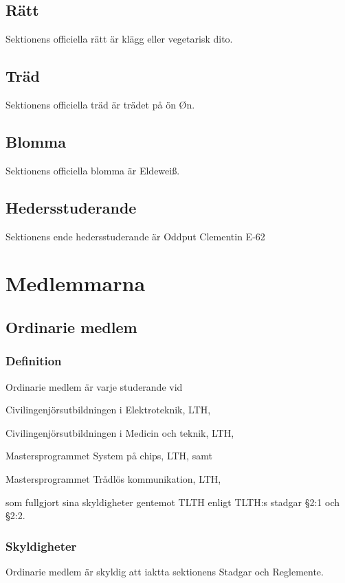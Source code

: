 \documentclass[10pt]{article}
\begin{document}
    \subsection{Rätt}
    Sektionens officiella rätt är klägg eller vegetarisk dito.
    \subsection{Träd}
    Sektionens officiella träd är trädet på ön Øn.
    \subsection{Blomma}
    Sektionens officiella blomma är Eldewei\ss.
    \subsection{Hedersstuderande}
    Sektionens ende hedersstuderande är Oddput Clementin E-62
    \newpage
    
    \section{Medlemmarna}
    \subsection{Ordinarie medlem}
    \subsubsection{Definition}
    Ordinarie medlem är varje studerande vid
    \begin{dashlist}
    \item Civilingenjörsutbildningen i Elektroteknik, LTH,
    \item Civilingenjörsutbildningen i Medicin och teknik, LTH,
    \item Mastersprogrammet System på chips, LTH, samt
    \item Mastersprogrammet Trådlös kommunikation, LTH,
    \end{dashlist}
    som fullgjort sina skyldigheter gentemot TLTH enligt TLTH:s stadgar §2:1 och §2:2.
    
    \subsubsection{Skyldigheter}
    Ordinarie medlem är skyldig att iaktta sektionens
    Stadgar och Reglemente.
    
\end{document}
